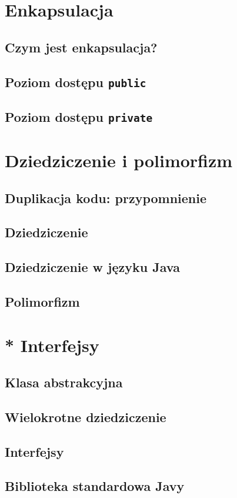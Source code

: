 \documentclass[11pt]{book}
\begin{document}
\chapter{Enkapsulacja}
\section{Czym jest enkapsulacja?}
\section{Poziom dostępu \texttt{public}}
\section{Poziom dostępu \texttt{private}}

\chapter{Dziedziczenie i polimorfizm}
\section{Duplikacja kodu: przypomnienie}
\section{Dziedziczenie}
\section{Dziedziczenie w języku Java}
\section{Polimorfizm}

\chapter{* Interfejsy}
\section{Klasa abstrakcyjna}
\section{Wielokrotne dziedziczenie}
\section{Interfejsy}
\section{Biblioteka standardowa Javy}
\end{document}
